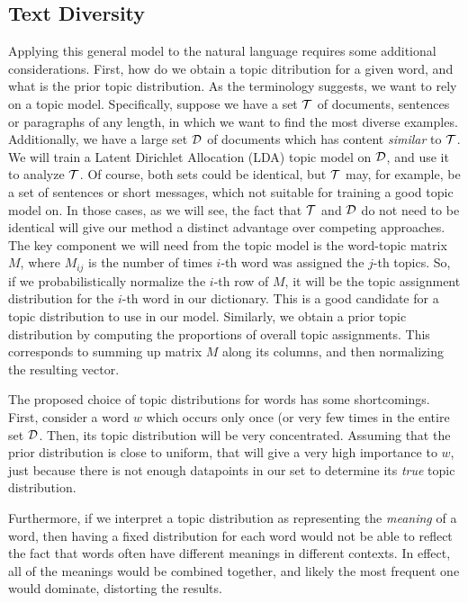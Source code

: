 \subsection{Text Diversity}

 Applying this general model to the natural language requires some
 additional considerations. First, how do we obtain a topic
 ditribution for a given word, and what is the prior topic
 distribution. As the terminology suggests, we want to rely on a topic
 model. Specifically, suppose we have a set ${\mathcal T}$ of documents, sentences or
 paragraphs of any length, in which we want to find the most diverse
 examples. Additionally, we have a large set ${\mathcal D}$ of documents which
 has content {\em similar} to ${\mathcal T}$. We will train a Latent Dirichlet
 Allocation (LDA) topic model on ${\mathcal D}$, 
 and use it to analyze ${\mathcal T}$. Of course, both sets could be identical,
 but ${\mathcal T}$ may, for example, be a set of sentences or short messages,
which not suitable for training a good topic model on. In those cases,
as we will see, the fact that ${\mathcal T}$ and ${\mathcal D}$ do not 
 need to be identical will give our method a distinct advantage over
 competing approaches. The key component we will need from the topic
 model is the word-topic matrix $M$, where $M_{ij}$ is the number of
 times $i$-th word was assigned the $j$-th topics. So, if we
 probabilistically normalize
 the $i$-th row of $M$, it will be the topic assignment distribution
 for the $i$-th word in our dictionary. This is a good candidate for a
 topic distribution to use in our model. Similarly, we obtain a prior
 topic distribution by computing the proportions of overall topic
 assignments. This corresponds to summing up matrix $M$ along its
 columns, and then normalizing the resulting vector.

The proposed choice of topic distributions for words has some
shortcomings. First, consider a word $w$ which occurs only once (or very
few times in the entire set ${\mathcal D}$. Then, its topic distribution will be
very concentrated. Assuming that the prior distribution is close to
uniform, that will give a very high importance to $w$, just because
there is not enough datapoints in our set to determine its {\em true}
topic distribution. 

Furthermore, if we interpret a topic distribution as representing the
{\em meaning} of a word, then having a fixed distribution for each
word would not be able to reflect the fact that words often have
different meanings in different contexts. In effect, all of the
meanings would be combined together, and likely the most frequent one
would dominate, distorting the results.

